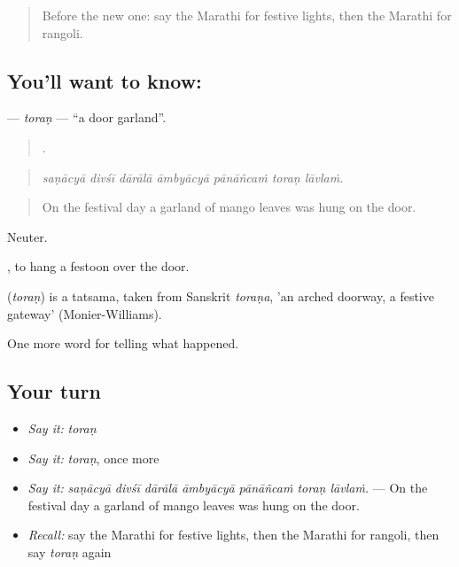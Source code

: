 \label{lesson:MR-C319-toran}



\begin{quote}
Before the new one: say the Marathi for festive lights, then the Marathi for rangoli.
\end{quote}

\subsection*{You'll want to know: }
\textbf{} — \emph{toraṇ} — \textquotedblleft{}a door garland\textquotedblright{}.

\begin{quote}
      .
\end{quote}

\begin{quote}
\emph{saṇācyā divśī dārālā āmbyācyā pānāñcaṁ toraṇ lāvlaṁ.}
\end{quote}

\begin{quote}
On the festival day a garland of mango leaves was hung on the door.
\end{quote}

Neuter.

  , to hang a festoon over the door.

\begin{cousinweb}
\textbf{} (\emph{toraṇ}) is a tatsama, taken from Sanskrit \emph{toraṇa}, 'an arched doorway, a festive gateway' (Monier-Williams).
\end{cousinweb}

\begin{grammarlens}[title={What you've built}]
One more word for telling what happened.
\end{grammarlens}

\subsection*{Your turn}
\begin{itemize}
\raggedright
  \item \emph{Say it:} \emph{toraṇ}
  \item \emph{Say it:} \emph{toraṇ}, once more
  \item \emph{Say it:} \emph{saṇācyā divśī dārālā āmbyācyā pānāñcaṁ toraṇ lāvlaṁ.} — On the festival day a garland of mango leaves was hung on the door.
  \item \emph{Recall:} say the Marathi for festive lights, then the Marathi for rangoli, then say \emph{toraṇ} again
\end{itemize}


